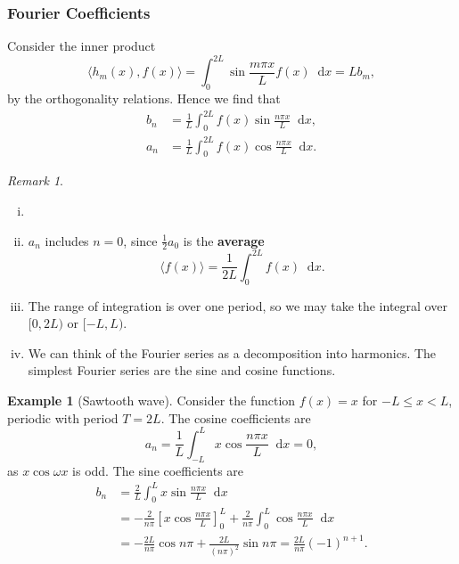 \documentclass[12pt]{article}
\newcommand{\diff}{\mathop{}\!\mathrm{d}}
\theoremstyle{definition}
\newtheorem{example}{Example}[section]
\theoremstyle{remark}
\newtheorem*{remark}{Remark}
\begin{document}
\subsubsection{Fourier Coefficients}%
\label{subsub:fourier_coefficients}

Consider the inner product
\[
	\langle h_m(x), f(x) \rangle = \int_{0}^{2L} \sin \frac{m \pi x}{L} f(x)\diff x = L b_m
,\]
by the orthogonality relations. Hence we find that
\begin{align*}
	b_n &= \frac{1}{L} \int_{0}^{2L}f(x) \sin \frac{n \pi x}{L}\diff x, \\
	a_n &= \frac{1}{L} \int_{0}^{2L}f(x) \cos \frac{n \pi x}{L}\diff x.
\end{align*}
\begin{remark}
	\begin{enumerate}[(i)]
		\item[]
		\item $a_n$ includes $n = 0$, since $\frac{1}{2} a_0$ is the \textbf{average}
			\[
				\langle f(x) \rangle = \frac{1}{2L} \int_{0}^{2L} f(x)\diff x
			.\]
		\item The range of integration is over one period, so we may take the integral over $[0, 2L)$ or $[-L, L)$.
		\item We can think of the Fourier series as a decomposition into harmonics. The simplest Fourier series are the sine and cosine functions.
	\end{enumerate}	
\end{remark}

\begin{adjustbox}{minipage = \columnwidth - 25.5pt, margin=1em, frame=1pt, margin=0em}
	\begin{example}[Sawtooth wave]
\item
	Consider the function $f(x) = x$ for $-L \leq x < L$, periodic with period $T = 2L$. The cosine coefficients are
	\[
	a_n = \frac{1}{L} \int_{-L}^{L} x \cos \frac{n \pi x}{L}\diff x = 0
	,\]
	as $x \cos \omega x$ is odd. The sine coefficients are
	\begin{align*}
		b_n &= \frac{2}{L} \int_{0}^{L} x \sin \frac{n \pi x}{L}\diff x \\
		    &= -\frac{2}{n \pi} \left[ x \cos \frac{n \pi x}{L} \right]_{0}^{L} + \frac{2}{n \pi} \int_{0}^{L} \cos \frac{n \pi x}{L}\diff x \\
		    &= - \frac{2L}{n \pi} \cos n \pi + \frac{2L}{(n \pi)^2} \sin n \pi = \frac{2L}{n \pi }(-1)^{n+1}.
	\end{align*}
	
\end{example}

\end{adjustbox}
\end{document}
